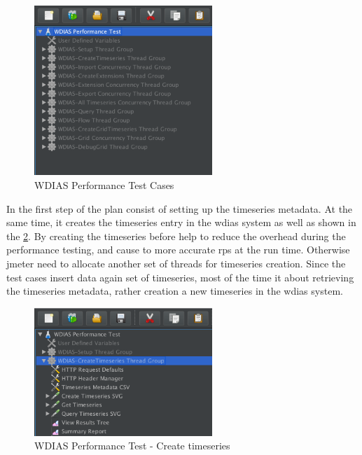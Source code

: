 \begin{figure}[htp]
    \centering
    \includegraphics[width=0.6\textwidth]{results/work_load/wdias_performance_test.png}
    \caption{WDIAS Performance Test Cases}
    \label{fi:wdias_performance_test}
\end{figure}

In the first step of the plan consist of setting up the timeseries metadata. At the same time, it creates the timeseries entry in the \acrshort{wdias} system as well as shown in the \ref{fi:test_create_timeseries}.
By creating the timeseries before help to reduce the overhead during the performance testing, and cause to more accurate \acrshort{rps} at the run time.
Otherwise \acrshort{jmeter} need to allocate another set of threads for timeseries creation. Since the test cases insert data again set of timeseries, most of the time it about retrieving the timeseries metadata, rather creation a new timeseries in the \acrshort{wdias} system.

\begin{figure}[htp]
    \centering
    \includegraphics[width=0.6\textwidth]{results/work_load/test_create_timeseries.png}
    \caption{WDIAS Performance Test - Create timeseries}
    \label{fi:test_create_timeseries}
\end{figure}

